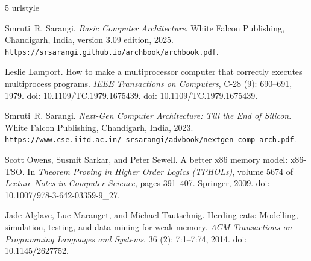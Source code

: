 \cleardoublepage
{}
{}
\begin{thebibliography}{5}
\providecommand{\natexlab}[1]{#1}
\providecommand{\url}[1]{\texttt{#1}}
\expandafter\ifx\csname urlstyle\endcsname\relax
  \providecommand{\doi}[1]{doi: #1}\else
  \providecommand{\doi}{doi: \begingroup \urlstyle{rm}\Url}\fi

Smruti~R. Sarangi.
\newblock \emph{Basic Computer Architecture}.
\newblock White Falcon Publishing, Chandigarh, India, version 3.09 edition,
  2025.
\newblock \url{https://srsarangi.github.io/archbook/archbook.pdf}.

Leslie Lamport.
\newblock How to make a multiprocessor computer that correctly executes
  multiprocess programs.
\newblock \emph{IEEE Transactions on Computers}, C-28 (9):
  690--691, 1979.
\newblock \doi{10.1109/TC.1979.1675439}.
\newblock \doi{10.1109/TC.1979.1675439}.

Smruti~R. Sarangi.
\newblock \emph{Next-Gen Computer Architecture: Till the End of Silicon}.
\newblock White Falcon Publishing, Chandigarh, India, 2023.
\newblock
  \url{https://www.cse.iitd.ac.in/~srsarangi/advbook/nextgen-comp-arch.pdf}.

Scott Owens, Susmit Sarkar, and Peter Sewell.
\newblock A better x86 memory model: x86-{TSO}.
\newblock In \emph{Theorem Proving in Higher Order Logics (TPHOLs)}, volume
  5674 of \emph{Lecture Notes in Computer Science}, pages 391--407. Springer,
  2009.
\newblock \doi{10.1007/978-3-642-03359-9_27}.

Jade Alglave, Luc Maranget, and Michael Tautschnig.
\newblock Herding cats: Modelling, simulation, testing, and data mining for
  weak memory.
\newblock \emph{ACM Transactions on Programming Languages and Systems},
  36 (2): 7:1--7:74, 2014.
\newblock \doi{10.1145/2627752}.

\end{thebibliography}

\glsaddall
\printglossary[title=Glossary]

\printindex



